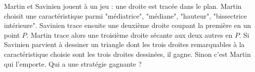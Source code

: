 Martin et Savinien jouent à un jeu : une droite est tracée dans le plan. Martin choisit une caractéristique parmi "médiatrice", "médiane", "hauteur", "bissectrice intérieure". Savinien trace ensuite une deuxième droite coupant la première en un point $P$. Martin trace alors une troisième droite sécante aux deux autres en $P$. Si Savinien parvient à dessiner un triangle dont les trois droites remarquables à la caractéristique choisie sont les trois droites dessinées, il gagne. Sinon c'est Martin qui l'emporte. Qui a une stratégie gagnante ?